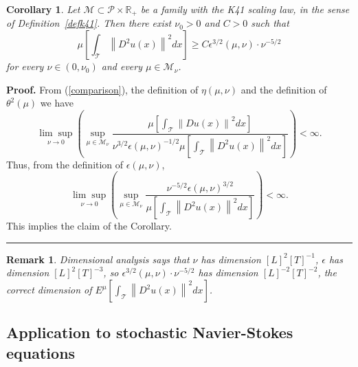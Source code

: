 \documentclass[11pt]{preprint}
\newtheorem{corollary}[theorem]{Corollary}
\newtheorem{remark}[theorem]{Remark}
\newenvironment{proof}[1][Proof]{\textbf{#1.} }{\ \rule{0.5em}{0.5em}}
\begin{document}
\begin{corollary}
Let $\mathcal{M}\subset\mathcal{P}\times\mathbb{R}_{+}$ be a family with the
K41 scaling law, in the sense of Definition~\ref{defk41}. Then there exist
$\nu_{0}>0$ and $C>0$ such that
\[
\mu\left[  \int_{\mathcal{T}}\left\|  D^{2}u\left(  x\right)  \right\|
^{2}dx\right]  \geq C\epsilon^{3/2}\left(  \mu,\nu\right)  \cdot\nu^{-5/2}%
\]
for every $\nu\in\left(  0,\nu_{0}\right)  $ and every $\mu\in\mathcal{M}%
_{\nu}$.
\end{corollary}

\begin{proof}
From (\ref{comparison}), the definition of $\eta\left(  \mu,\nu\right)  $ and
the definition of $\theta^{2}\left(  \mu\right)  $ we have
\[
\underset{\nu\rightarrow0}{\lim\sup}\left(  \sup_{\mu\in\mathcal{M}_{\nu}%
}\frac{\mu\left[  \int_{\mathcal{T}}\left\|  Du\left(  x\right)  \right\|
^{2}dx\right]  }{\nu^{3/2}\epsilon\left(  \mu,\nu\right)  ^{-1/2}\mu\left[
\int_{\mathcal{T}}\left\|  D^{2}u\left(  x\right)  \right\|  ^{2}dx\right]
}\right)  <\infty.
\]
Thus, from the definition of $\epsilon\left(  \mu,\nu\right)  $,
\[
\underset{\nu\rightarrow0}{\lim\sup}\left(  \sup_{\mu\in\mathcal{M}_{\nu}%
}\frac{\nu^{-5/2}\epsilon\left(  \mu,\nu\right)  ^{3/2}}{\mu\left[
\int_{\mathcal{T}}\left\|  D^{2}u\left(  x\right)  \right\|  ^{2}dx\right]
}\right)  <\infty.
\]
This implies the claim of the Corollary.
\end{proof}

\begin{remark}
Dimensional analysis says that $\nu$ has dimension $\left[  L\right]
^{2}\left[  T\right]  ^{-1}$, $\epsilon$ has dimension $\left[  L\right]
^{2}\left[  T\right]  ^{-3}$, so $\epsilon^{3/2}\left(  \mu,\nu\right)
\cdot\nu^{-5/2}$ has dimension $\left[  L\right]  ^{-2}\left[  T\right]
^{-2}$, the correct dimension of $E^{\mu}\left[  \int_{\mathcal{T}}\left\|
D^{2}u\left(  x\right)  \right\|  ^{2}dx\right]  $.
\end{remark}


\subsection{Application to stochastic Navier-Stokes equations}
\end{document}
